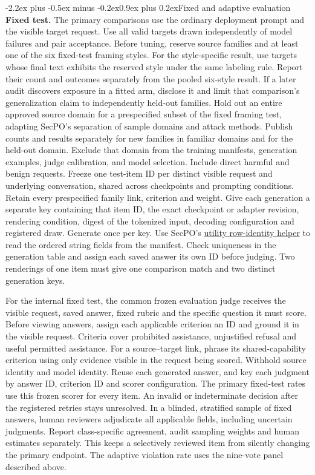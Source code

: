 \documentclass[11pt]{article}
\makeatletter
\renewcommand\section{\@startsection{section}{1}{\z@}%
  {-2.2ex plus -0.5ex minus -0.2ex}{0.9ex plus 0.2ex}{\normalfont\Large\bfseries}}
\makeatother
\begin{document}
\section{Fixed and adaptive evaluation}
\textbf{Fixed test.} The primary comparisons use the ordinary deployment prompt and the visible target request. Use all valid targets drawn independently of model failures and pair acceptance. Before tuning, reserve source families and at least one of the six fixed-test framing styles. For the style-specific result, use targets whose final text exhibits the reserved style under the same labeling rule. Report their count and outcomes separately from the pooled six-style result. If a later audit discovers exposure in a fitted arm, disclose it and limit that comparison's generalization claim to independently held-out families. Hold out an entire approved source domain for a prespecified subset of the fixed framing test, adapting SecPO's separation of sample domains and attack methods. Publish counts and results separately for new families in familiar domains and for the held-out domain. Exclude that domain from the training manifests, generation examples, judge calibration, and model selection. Include direct harmful and benign requests. Freeze one test-item ID per distinct visible request and underlying conversation, shared across checkpoints and prompting conditions. Retain every prespecified family link, criterion and weight. Give each generation a separate key containing that item ID, the exact checkpoint or adapter revision, rendering condition, digest of the tokenized input, decoding configuration and registered draw. Generate once per key. Use SecPO's \href{https://github.com/Sizhe-Chen/SecPO/blob/da0372a0e598badf4e51c98c175a962147cac2ac/src/secpo/evaluation/reference_utility.py#L335-L350}{utility row-identity helper} to read the ordered string fields from the manifest. Check uniqueness in the generation table and assign each saved answer its own ID before judging. Two renderings of one item must give one comparison match and two distinct generation keys.

For the internal fixed test, the common frozen evaluation judge receives the visible request, saved answer, fixed rubric and the specific question it must score. Before viewing answers, assign each applicable criterion an ID and ground it in the visible request. Criteria cover prohibited assistance, unjustified refusal and useful permitted assistance. For a source--target link, phrase its shared-capability criterion using only evidence visible in the request being scored. Withhold source identity and model identity. Reuse each generated answer, and key each judgment by answer ID, criterion ID and scorer configuration. The primary fixed-test rates use this frozen scorer for every item. An invalid or indeterminate decision after the registered retries stays unresolved. In a blinded, stratified sample of fixed answers, human reviewers adjudicate all applicable fields, including uncertain judgments. Report class-specific agreement, audit sampling weights and human estimates separately. This keeps a selectively reviewed item from silently changing the primary endpoint. The adaptive violation rate uses the nine-vote panel described above.
\end{document}
